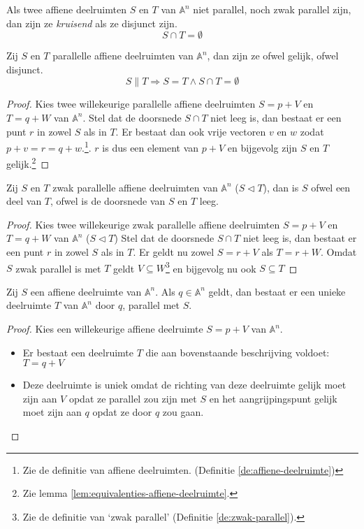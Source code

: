 \documentclass[main.tex]{subfiles}
\begin{document}
\begin{de}
  Als twee affiene deelruimten $S$ en $T$ van $\mathbb{A}^{n}$ niet parallel, noch zwak parallel zijn, dan zijn ze \emph{kruisend} als ze disjunct zijn.
  \[ S \cap T = \emptyset \]
\end{de}

\begin{st}
  Zij $S$ en $T$ parallelle affiene deelruimten van $\mathbb{A}^{n}$, dan zijn ze ofwel gelijk, ofwel disjunct.
  \[ S \parallel T \Rightarrow S=T \wedge S \cap T = \emptyset \]

  \begin{proof}
    Kies twee willekeurige parallelle affiene deelruimten $S = p + V$ en $T = q + W$ van $\mathbb{A}^{n}$.
    Stel dat de doorsnede $S \cap T$ niet leeg is, dan bestaat er een punt $r$ in zowel $S$ als in $T$.
    Er bestaat dan ook vrije vectoren $v$ en $w$ zodat $p + v = r = q + w$.\footnote{Zie de definitie van affiene deelruimten. (Definitie \ref{de:affiene-deelruimte})}.
    $r$ is dus een element van $p + V$ en bijgevolg zijn $S$ en $T$ gelijk.\footnote{Zie lemma \ref{lem:equivalenties-affiene-deelruimte}.}
  \end{proof}
\end{st}

\begin{st}
  Zij $S$ en $T$ zwak parallelle affiene deelruimten van $\mathbb{A}^{n}$ ($S \vartriangleleft  T$), dan is $S$ ofwel een deel van $T$, ofwel is de doorsnede van $S$ en $T$ leeg.

  \begin{proof}
    Kies twee willekeurige zwak parallelle affiene deelruimten $S = p + V$ en $T = q + W$ van $\mathbb{A}^{n}$ ($S \vartriangleleft  T$)
    Stel dat de doorsnede $S \cap T$ niet leeg is, dan bestaat er een punt $r$ in zowel $S$ als in $T$.
    Er geldt nu zowel $S = r + V$ als $T = r + W$.
    Omdat $S$ zwak parallel is met $T$ geldt $V \subseteq W$\footnote{Zie de definitie van `zwak parallel' (Definitie \ref{de:zwak-parallel}).} en bijgevolg nu ook $S \subseteq T$
  \end{proof}
\end{st}

\begin{st}
  Zij $S$ een affiene deelruimte van $\mathbb{A}^{n}$.
  Als $q \in \mathbb{A}^{n}$ geldt, dan bestaat er een unieke deelruimte $T$ van $\mathbb{A}^{n}$ door $q$, parallel met $S$.

  \begin{proof}
    Kies een willekeurige affiene deelruimte $S = p + V$ van $\mathbb{A}^{n}$.
    \begin{itemize}
    \item Er bestaat een deelruimte $T$ die aan bovenstaande beschrijving voldoet: $T = q + V$
    \item Deze deelruimte is uniek omdat de richting van deze deelruimte gelijk moet zijn aan $V$ opdat ze parallel zou zijn met $S$ en het aangrijpingspunt gelijk moet zijn aan $q$ opdat ze door $q$ zou gaan.
    \end{itemize}
  \end{proof}
\end{st}
\end{document}
